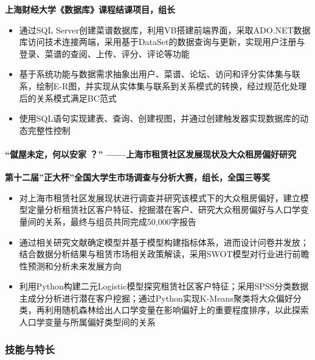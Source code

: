 \documentclass[
]{article}
\providecommand{\tightlist}{%
  \setlength{\itemsep}{0pt}\setlength{\parskip}{0pt}}
\begin{document}
\textbf{上海财经大学《数据库》课程结课项目，组长}

\begin{itemize}
\tightlist
\item
  通过SQL
  Server创建菜谱数据库，利用VB搭建前端界面，采取ADO.NET数据库访问技术连接两端，采用基于DataSet的数据查询与更新，实现用户注册与登录、菜谱的查阅、上传、评分、评论等功能
\item
  基于系统功能与数据需求抽象出用户、菜谱、论坛、访问和评分实体集与联系，绘制E-R图，并实现从实体集与联系到关系模式的转换，经过规范化处理后的关系模式满足BC范式
\item
  使用SQL语句实现建表、查询、创建视图，并通过创建触发器实现数据库的动态完整性控制
\end{itemize}

\hypertarget{ux50e6ux5c4bux672aux5b9aux4f55ux4ee5ux5b89ux5bb6-ux4e0aux6d77ux5e02ux79dfux8d41ux793eux533aux53d1ux5c55ux73b0ux72b6ux53caux5927ux4f17ux79dfux623fux504fux597dux7814ux7a76}{%
\paragraph{``僦屋未定，何以安家 ？''
------上海市租赁社区发展现状及大众租房偏好研究}\label{ux50e6ux5c4bux672aux5b9aux4f55ux4ee5ux5b89ux5bb6-ux4e0aux6d77ux5e02ux79dfux8d41ux793eux533aux53d1ux5c55ux73b0ux72b6ux53caux5927ux4f17ux79dfux623fux504fux597dux7814ux7a76}}

\textbf{第十二届''正大杯''全国大学生市场调查与分析大赛，组长，全国三等奖}

\begin{itemize}
\tightlist
\item
  对上海市租赁社区发展现状进行调查并研究该模式下的大众租房偏好，建立模型定量分析租赁社区客户特征、挖掘潜在客户、研究大众租房偏好与人口学变量间的关系，最终与组员共同完成50,000字报告
\item
  通过相关研究文献确定模型并基于模型构建指标体系，进而设计问卷并发放；结合数据分析结果与租赁市场相关政策解读，采用SWOT模型对行业进行前瞻性预测和分析未来发展方向
\item
  利用Python构建二元Logistic模型探究租赁社区客户特征；采用SPSS分类数据主成分分析进行潜在客户挖掘；通过Python实现K-Means聚类将大众偏好分类，再利用随机森林给出人口学变量在影响偏好上的重要程度排序，以此探索人口学变量与所属偏好类型间的关系
\end{itemize}

\hypertarget{ux6280ux80fdux4e0eux7279ux957f}{%
\subsubsection{技能与特长}\label{ux6280ux80fdux4e0eux7279ux957f}}
\end{document}
